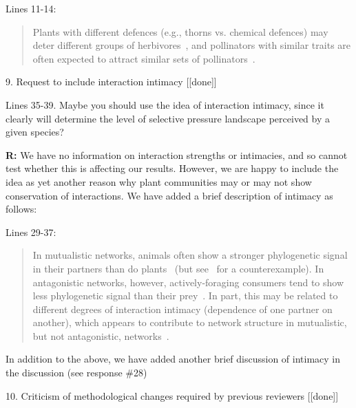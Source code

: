\documentclass[12pt]{letter}
\newenvironment{refquote}{\bigskip \begin{it}}{\end{it}\smallskip}
\begin{document}
		Lines 11-14:

		\begin{quotation}

			Plants with different defences 
		  	(e.g., thorns vs. chemical defences) may deter different groups of 
		  	herbivores~\citep{Ehrlich1964,Johnson2014}, and pollinators with similar traits are often expected to attract similar sets of pollinators~\citep{Waser1996,Fenster2004,Ollerton2009}.

		\end{quotation}


	9. Request to include interaction intimacy [[done]]

		\begin{refquote}
		Lines 35-39. Maybe you should use the idea of interaction intimacy, since it clearly will determine the level of selective pressure landscape perceived by a given species?
		\end{refquote}


		\textbf{R:} We have no information on interaction strengths or intimacies, and so cannot test whether this is affecting our results. However, we are happy to include the idea as yet another reason why plant communities may or may not show conservation of interactions. We have added a brief description of intimacy as follows:


		Lines 29-37:

		\begin{quotation}

			In mutualistic networks, animals often show a stronger phylogenetic signal in their partners than do plants~\citep{Rezende2007a,Chamberlain2014,Rohr2014,Vamosi2014,Lind2015,Fontaine2015} (but see~\citet{Rafferty2013} for a counterexample). In antagonistic networks, however, actively-foraging consumers tend to show less phylogenetic signal than their prey~\citep{Ives2006,Cagnolo2011,Naisbit2011,Fontaine2015}. In part, this may be related to different degrees of interaction intimacy (dependence of one partner on another), which appears to contribute to network structure in mutualistic, but not antagonistic, networks~\citep{Guimaraes2007,Ponisio2017}. 

		\end{quotation}


		In addition to the above, we have added another brief discussion of intimacy in the discussion (see response \#28)


	10. Criticism of methodological changes required by previous reviewers [[done]]
\end{document}
